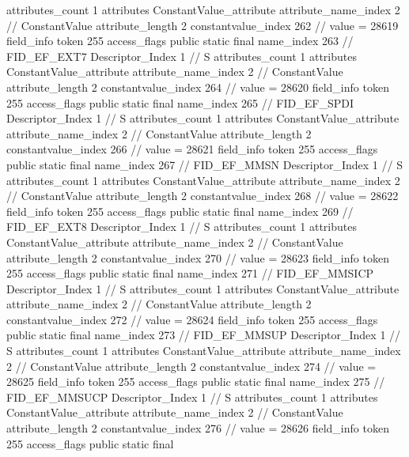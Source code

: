 {{{{{				attributes_count	1
				attributes {
				ConstantValue_attribute {
					attribute_name_index	2		// ConstantValue
					attribute_length	2
					constantvalue_index	262		// value = 28619
				}
				}
			}
			field_info {
				token	255
				access_flags	public static final
				name_index	263		// FID_EF_EXT7
				Descriptor_Index	1		// S
				attributes_count	1
				attributes {
				ConstantValue_attribute {
					attribute_name_index	2		// ConstantValue
					attribute_length	2
					constantvalue_index	264		// value = 28620
				}
				}
			}
			field_info {
				token	255
				access_flags	public static final
				name_index	265		// FID_EF_SPDI
				Descriptor_Index	1		// S
				attributes_count	1
				attributes {
				ConstantValue_attribute {
					attribute_name_index	2		// ConstantValue
					attribute_length	2
					constantvalue_index	266		// value = 28621
				}
				}
			}
			field_info {
				token	255
				access_flags	public static final
				name_index	267		// FID_EF_MMSN
				Descriptor_Index	1		// S
				attributes_count	1
				attributes {
				ConstantValue_attribute {
					attribute_name_index	2		// ConstantValue
					attribute_length	2
					constantvalue_index	268		// value = 28622
				}
				}
			}
			field_info {
				token	255
				access_flags	public static final
				name_index	269		// FID_EF_EXT8
				Descriptor_Index	1		// S
				attributes_count	1
				attributes {
				ConstantValue_attribute {
					attribute_name_index	2		// ConstantValue
					attribute_length	2
					constantvalue_index	270		// value = 28623
				}
				}
			}
			field_info {
				token	255
				access_flags	public static final
				name_index	271		// FID_EF_MMSICP
				Descriptor_Index	1		// S
				attributes_count	1
				attributes {
				ConstantValue_attribute {
					attribute_name_index	2		// ConstantValue
					attribute_length	2
					constantvalue_index	272		// value = 28624
				}
				}
			}
			field_info {
				token	255
				access_flags	public static final
				name_index	273		// FID_EF_MMSUP
				Descriptor_Index	1		// S
				attributes_count	1
				attributes {
				ConstantValue_attribute {
					attribute_name_index	2		// ConstantValue
					attribute_length	2
					constantvalue_index	274		// value = 28625
				}
				}
			}
			field_info {
				token	255
				access_flags	public static final
				name_index	275		// FID_EF_MMSUCP
				Descriptor_Index	1		// S
				attributes_count	1
				attributes {
				ConstantValue_attribute {
					attribute_name_index	2		// ConstantValue
					attribute_length	2
					constantvalue_index	276		// value = 28626
				}
				}
			}
			field_info {
				token	255
				access_flags	public static final
}}}}}
